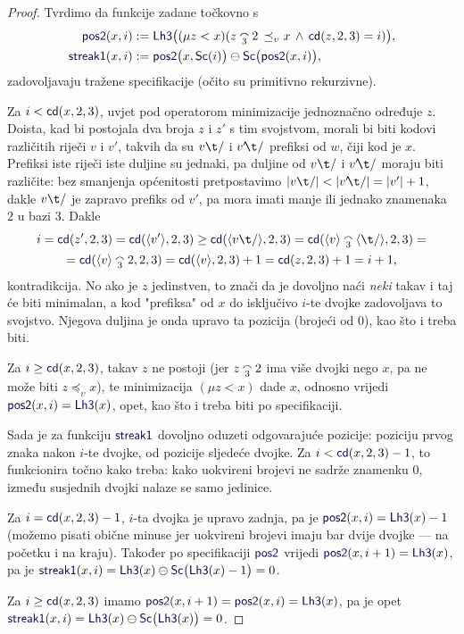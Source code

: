 \begin{proof}
Tvrdimo da funkcije zadane točkovno s
\begin{align}
    \f{pos2}(x,i)&:=\f{Lh3}\bigl((\mu z<x)(z\conc32\,\preceq_\upsilon x\,\land\,\f{cd}(z,2,3)=i)\bigr),\\
    \f{streak1}(x,i)&:=\f{pos2}\bigl(x,\f{Sc}(i)\bigr)\ominus\f{Sc}\bigl(\f{pos2}(x,i)\bigr),
\end{align}
zadovoljavaju tražene specifikacije (očito su primitivno rekurzivne).

Za $i<\f{cd}(x,2,3)$, uvjet pod operatorom minimizacije jednoznačno određuje $z$. Doista, kad bi postojala dva broja $z$ i $z'$ s tim svojstvom, morali bi biti kodovi različitih riječi $v$ i $v'$, takvih da su $v\t/$ i $v'\!\t/$ prefiksi od $w$, čiji kod je $x$. Prefiksi iste riječi iste duljine su jednaki, pa duljine od $v\t/$ i $v'\!\t/$ moraju biti različite: bez smanjenja općenitosti pretpostavimo $\dulj{v\t/}<\dulj{v'\!\t/}=\dulj{v'}+1$, dakle $v\t/$ je zapravo prefiks od $v'$, pa mora imati manje ili jednako znamenaka $2$ u bazi $3$. Dakle
\begin{multline}
    i=\f{cd}(z',2,3)=\f{cd}(\kr{v'},2,3)\ge\f{cd}(\kr{v\t/},2,3)=\f{cd}(\kr v\conc3\kr{\t/},2,3)=\\
    =\f{cd}(\kr v\conc32,2,3)=\f{cd}(\kr v,2,3)+1=\f{cd}(z,2,3)+1=i+1\text,
\end{multline}
kontradikcija. No ako je $z$ jedinstven, to znači da je dovoljno naći \emph{neki} takav i taj će biti minimalan, a kod "prefiksa" od $x$ do isključivo $i$-te dvojke zadovoljava to svojstvo. Njegova duljina je onda upravo ta pozicija (brojeći od $0$), kao što i treba biti.

Za $i\ge\f{cd}(x,2,3)$, takav $z$ ne postoji (jer $z\conc32$ ima više dvojki nego $x$, pa ne može biti $z\preceq_\upsilon x$), te minimizacija $(\mu z<x)$ dade $x$, odnosno vrijedi $\f{pos2}(x,i)=\f{Lh3}(x)$, opet, kao što i treba biti po specifikaciji.

Sada je za funkciju $\f{streak1}$ dovoljno oduzeti odgovarajuće pozicije: poziciju prvog znaka nakon $i$-te dvojke, od pozicije sljedeće dvojke. Za $i<\f{cd}(x,2,3)-1$, to funkcionira točno kako treba: kako uokvireni brojevi ne sadrže znamenku $0$, između susjednih dvojki nalaze se samo jedinice.

Za $i=\f{cd}(x,2,3)-1$, $i$-ta dvojka je upravo zadnja, pa je $\f{pos2}(x,i)=\f{Lh3}(x)-1$ (možemo pisati obične minuse jer uokvireni brojevi imaju bar dvije dvojke --- na početku i na kraju). Također po specifikaciji $\f{pos2}$ vrijedi $\f{pos2}(x,i+1)=\f{Lh3}(x)$, pa je $\f{streak1}(x,i)=\f{Lh3}(x)\ominus\f{Sc}\bigl(\f{Lh3}(x)-1\bigr)=0$.

Za $i\ge\f{cd}(x,2,3)$ imamo $\f{pos2}(x,i+1)=\f{pos2}(x,i)=\f{Lh3}(x)$, pa je opet $\f{streak1}(x,i)=\f{Lh3}(x)\ominus\f{Sc}\bigl(\f{Lh3}(x)\bigr)=0$.
\end{proof}

